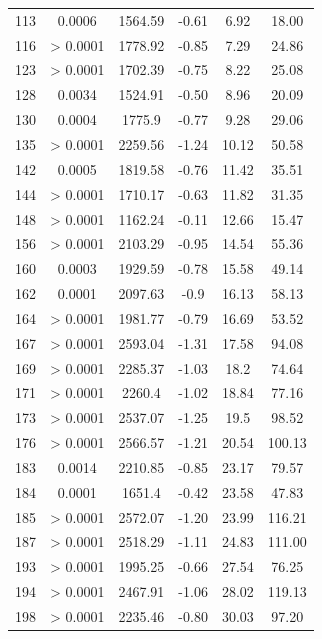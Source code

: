 {\begin{longtable}{cccccc}
113 & {\color{red}0.0006} & 1564.59 & -0.61 & 6.92 & 18.00 \\
116 & {\color{red}> 0.0001} & 1778.92 & -0.85 & 7.29 & 24.86 \\
123 & {\color{red}> 0.0001} & 1702.39 & -0.75 & 8.22 & 25.08 \\
128 & {\color{red}0.0034} & 1524.91 & -0.50 & 8.96 & 20.09 \\
130 & {\color{red}0.0004} & 1775.9 & -0.77 & 9.28 & 29.06 \\
135 & {\color{red}> 0.0001} & 2259.56 & -1.24 & 10.12 & 50.58 \\
142 & {\color{red}0.0005} & 1819.58 & -0.76 & 11.42 & 35.51 \\
144 & {\color{red}> 0.0001} & 1710.17 & -0.63 & 11.82 & 31.35 \\
148 & {\color{red}> 0.0001} & 1162.24 & -0.11 & 12.66 & 15.47 \\
156 & {\color{red}> 0.0001} & 2103.29 & -0.95 & 14.54 & 55.36 \\
160 & {\color{red}0.0003} & 1929.59 & -0.78 & 15.58 & 49.14 \\
162 & {\color{red}0.0001} & 2097.63 & -0.9 & 16.13 & 58.13 \\
164 & {\color{red}> 0.0001} & 1981.77 & -0.79 & 16.69 & 53.52 \\
167 & {\color{red}> 0.0001} & 2593.04 & -1.31 & 17.58 & 94.08 \\
169 & {\color{red}> 0.0001} & 2285.37 & -1.03 & 18.2 & 74.64 \\
171 & {\color{red}> 0.0001} & 2260.4 & -1.02 & 18.84 & 77.16 \\
173 & {\color{red}> 0.0001} & 2537.07 & -1.25 & 19.5 & 98.52 \\
176 & {\color{red}> 0.0001} & 2566.57 & -1.21 & 20.54 & 100.13 \\
183 & {\color{red}0.0014} & 2210.85 & -0.85 & 23.17 & 79.57 \\
184 & {\color{red}0.0001} & 1651.4 & -0.42 & 23.58 & 47.83 \\
185 & {\color{red}> 0.0001} & 2572.07 & -1.20 & 23.99 & 116.21 \\
187 & {\color{red}> 0.0001} & 2518.29 & -1.11 & 24.83 & 111.00 \\
193 & {\color{red}> 0.0001} & 1995.25 & -0.66 & 27.54 & 76.25 \\
194 & {\color{red}> 0.0001} & 2467.91 & -1.06 & 28.02 & 119.13 \\
198 & {\color{red}> 0.0001} & 2235.46 & -0.80 & 30.03 & 97.20 \\ \hline
\end{longtable}
}
